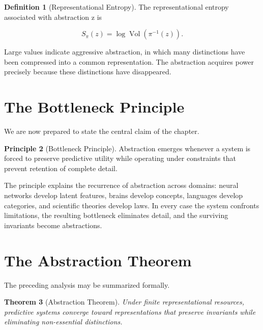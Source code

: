 \documentclass[11pt,oneside]{book}
\theoremstyle{plain}
\newtheorem{theorem}{Theorem}[chapter]
\theoremstyle{definition}
\newtheorem{definition}[theorem]{Definition}
\newtheorem{principle}[theorem]{Principle}
\theoremstyle{remark}
\DeclareMathOperator{\Vol}{Vol}
\begin{document}
\begin{definition}[Representational Entropy]
The representational entropy associated with abstraction z is

\begin{equation}
S_{\pi}(z)
=
\log
\Vol
\left(
\pi^{-1}(z)
\right).
\end{equation}

\end{definition}

Large values indicate aggressive abstraction, in which many distinctions have been compressed into a common representation. The abstraction acquires power precisely because these distinctions have disappeared.

\section{The Bottleneck Principle}

We are now prepared to state the central claim of the chapter.

\begin{principle}[Bottleneck Principle]
Abstraction emerges whenever a system is forced to preserve predictive utility while operating under constraints that prevent retention of complete detail.
\end{principle}

The principle explains the recurrence of abstraction across domains: neural networks develop latent features, brains develop concepts, languages develop categories, and scientific theories develop laws. In every case the system confronts limitations, the resulting bottleneck eliminates detail, and the surviving invariants become abstractions.

\section{The Abstraction Theorem}

The preceding analysis may be summarized formally.

\begin{theorem}[Abstraction Theorem]
Under finite representational resources, predictive systems converge toward representations that preserve invariants while eliminating non-essential distinctions.
\end{theorem}
\end{document}
